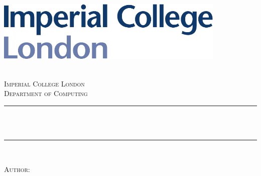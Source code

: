 \begin{titlepage}

\newcommand{\HRule}{\rule{\linewidth}{0.5mm}} %



\begin{center} %
\includegraphics[width = 11cm]{./figures/imperial}\\[0.5cm] 
\vspace{2.5cm}

\textsc{\LARGE \reporttype}\\[1.5cm] 
\textsc{\Large Imperial College London}\\[0.5cm] 
\textsc{\large Department of Computing}\\[0.5cm] 

\HRule \\[0.4cm]
{ \huge \bfseries \reporttitle}\\ %
\HRule \\[1.5cm]
\end{center}


\vspace{1cm}
\begin{minipage}{0.4\hsize}
\flushleft
\textsc{Author:}


\end{minipage}
\end{titlepage}
